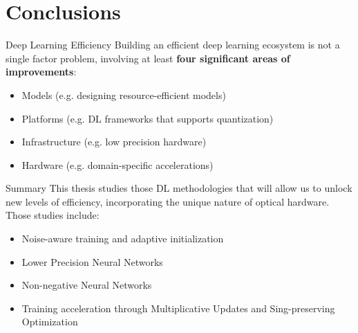 \section{Conclusions}

\begin{frame}{Deep Learning Efficiency}
Building an efficient deep learning ecosystem is not a single factor problem,  
involving at least \textbf{four significant areas of improvements}:

\begin{itemize}
    \item Models (e.g. designing resource-efficient models)
    \item Platforms (e.g. DL frameworks that supports quantization)
    \item Infrastructure (e.g. low precision hardware)
    \item Hardware (e.g. domain-specific accelerations) 
\end{itemize}%
\end{frame}

\begin{frame}{Summary}
    This thesis studies those DL methodologies that will allow us to unlock new levels of efficiency, incorporating the unique nature of optical hardware. Those studies include:
    \begin{itemize}
        \item Noise-aware training and adaptive initialization
        \item Lower Precision Neural Networks
        \item Non-negative Neural Networks
        \item Training acceleration through Multiplicative Updates and Sing-preserving Optimization  
    \end{itemize}
\end{frame}

